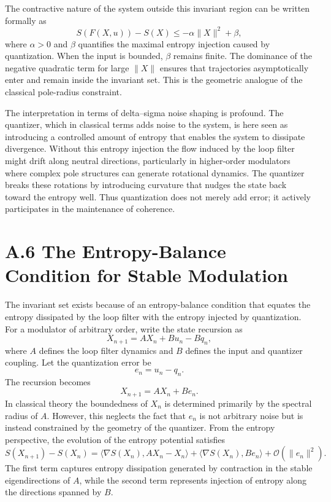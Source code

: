 The contractive nature of the system outside this invariant region can be written formally as
\[
S(F(X,u)) - S(X) \leq -\alpha \|X\|^2 + \beta,
\]
where \(\alpha>0\) and \(\beta\) quantifies the maximal entropy injection caused by quantization. When the input is bounded, \(\beta\) remains finite. The dominance of the negative quadratic term for large \(\|X\|\) ensures that trajectories asymptotically enter and remain inside the invariant set. This is the geometric analogue of the classical pole-radius constraint.

The interpretation in terms of delta–sigma noise shaping is profound. The quantizer, which in classical terms adds noise to the system, is here seen as introducing a controlled amount of entropy that enables the system to dissipate divergence. Without this entropy injection the flow induced by the loop filter might drift along neutral directions, particularly in higher-order modulators where complex pole structures can generate rotational dynamics. The quantizer breaks these rotations by introducing curvature that nudges the state back toward the entropy well. Thus quantization does not merely add error; it actively participates in the maintenance of coherence.

\section{A.6 The Entropy-Balance Condition for Stable Modulation}

The invariant set exists because of an entropy-balance condition that equates the entropy dissipated by the loop filter with the entropy injected by quantization. For a modulator of arbitrary order, write the state recursion as
\[
X_{n+1} = A X_n + B u_n - B q_n,
\]
where \(A\) defines the loop filter dynamics and \(B\) defines the input and quantizer coupling. Let the quantization error be
\[
e_n = u_n - q_n.
\]
The recursion becomes
\[
X_{n+1} = A X_n + B e_n.
\]
In classical theory the boundedness of \(X_n\) is determined primarily by the spectral radius of \(A\). However, this neglects the fact that \(e_n\) is not arbitrary noise but is instead constrained by the geometry of the quantizer. From the entropy perspective, the evolution of the entropy potential satisfies
\[
S(X_{n+1}) - S(X_n) = \langle \nabla S(X_n), A X_n - X_n \rangle + \langle \nabla S(X_n), B e_n \rangle + \mathcal{O}(\|e_n\|^2).
\]
The first term captures entropy dissipation generated by contraction in the stable eigendirections of \(A\), while the second term represents injection of entropy along the directions spanned by \(B\).

